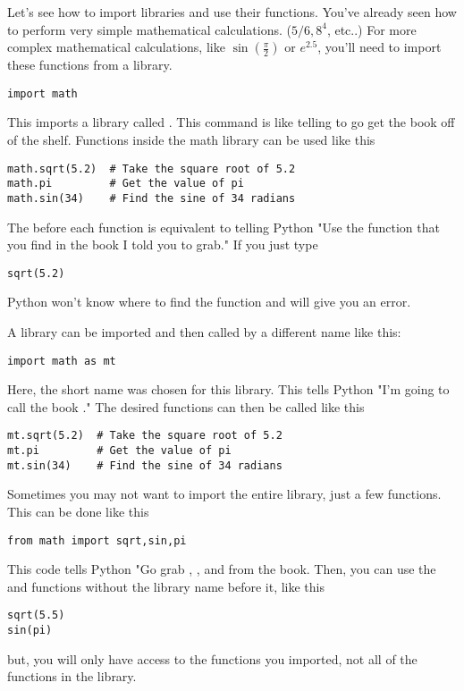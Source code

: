 Let's see how to import libraries and use their functions. You've
already seen how to perform very simple mathematical calculations. ($5/6, 8^4$,
etc..)  For more complex
mathematical calculations, like $\sin(\frac{\pi}{2})$ or $e^{2.5}$,
you'll need to import these functions from a library.
\begin{Verbatim}
import math
\end{Verbatim}
This imports a library called .  This command is like telling to go get the  book off of the shelf.  Functions inside the
math library can be used like this
\begin{Verbatim}
math.sqrt(5.2)  # Take the square root of 5.2
math.pi         # Get the value of pi
math.sin(34)    # Find the sine of 34 radians
\end{Verbatim}
The  before each function is equivalent to telling Python "Use the  function that you find in the  book I told you to grab." If you just type
\begin{Verbatim}
sqrt(5.2)
\end{Verbatim}
Python won't know where to find the  function and will give you an error.



A library can be imported and then called by a different name like
this:
\begin{Verbatim}
import math as mt
\end{Verbatim}
Here, the short name  was chosen for this library.  This tells Python "I'm going to call the  book ."
The desired functions can then be called like this
\begin{Verbatim}
mt.sqrt(5.2)  # Take the square root of 5.2
mt.pi         # Get the value of pi
mt.sin(34)    # Find the sine of 34 radians
\end{Verbatim}

Sometimes you may not want to import the entire library, just a few
functions. This can be done like this
\begin{Verbatim}
from math import sqrt,sin,pi
\end{Verbatim}
This code tells Python "Go grab , , and  from the  book.  Then, you can use the  and  functions
without the library name before it, like this
\begin{Verbatim}
sqrt(5.5)
sin(pi)
\end{Verbatim}
but, you will only have access to the functions you imported, not all of the functions in the  library.

